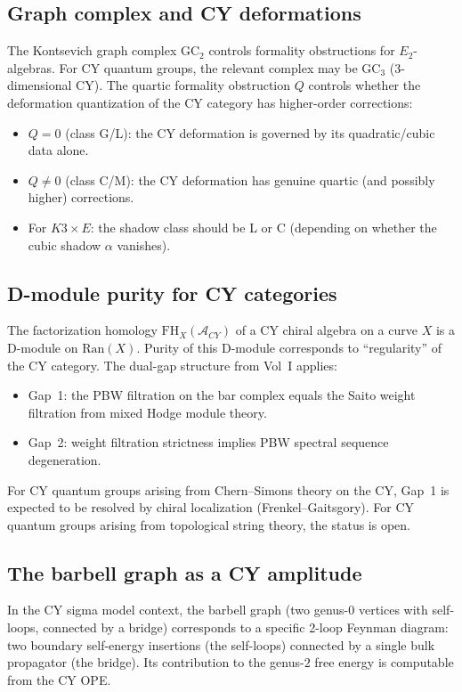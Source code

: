 \documentclass[11pt]{article}
\newcommand{\cA}{\mathcal{A}}
\begin{document}
\subsection{Graph complex and CY deformations}

The Kontsevich graph complex $\mathrm{GC}_2$ controls formality
obstructions for $E_2$-algebras. For CY quantum groups, the
relevant complex may be $\mathrm{GC}_3$ (3-dimensional CY). The
quartic formality obstruction $Q$ controls whether the deformation
quantization of the CY category has higher-order corrections:
\begin{itemize}
 \item $Q = 0$ (class G/L): the CY deformation is governed by
 its quadratic/cubic data alone.
 \item $Q \neq 0$ (class C/M): the CY deformation has genuine
 quartic (and possibly higher) corrections.
 \item For $K3 \times E$: the shadow class should be L or C
 (depending on whether the cubic shadow $\alpha$ vanishes).
\end{itemize}

\subsection{D-module purity for CY categories}

The factorization homology $\mathrm{FH}_X(\cA_{CY})$ of a CY
chiral algebra on a curve $X$ is a D-module on $\mathrm{Ran}(X)$.
Purity of this D-module corresponds to ``regularity'' of the CY
category. The dual-gap structure from Vol~I applies:
\begin{itemize}
 \item Gap~1: the PBW filtration on the bar complex equals the
 Saito weight filtration from mixed Hodge module theory.
 \item Gap~2: weight filtration strictness implies PBW spectral
 sequence degeneration.
\end{itemize}
For CY quantum groups arising from Chern--Simons theory on the CY,
Gap~1 is expected to be resolved by chiral localization
(Frenkel--Gaitsgory). For CY quantum groups arising from
topological string theory, the status is open.

\subsection{The barbell graph as a CY amplitude}

In the CY sigma model context, the barbell graph (two genus-$0$
vertices with self-loops, connected by a bridge) corresponds to a
specific 2-loop Feynman diagram: two boundary self-energy
insertions (the self-loops) connected by a single bulk propagator
(the bridge). Its contribution to the genus-$2$ free energy is
computable from the CY OPE.
\end{document}
